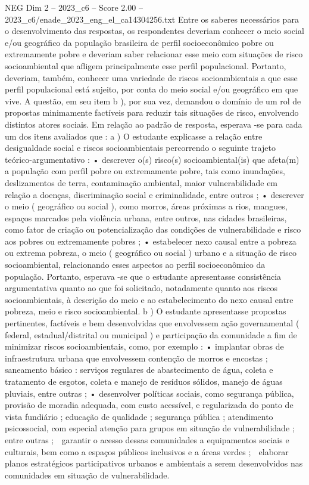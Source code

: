 \begin{textsample}{NEG Dim 2 – 2023\_c6 – Score 2.00 – 2023\_c6/enade\_2023\_eng\_el\_ca14304256.txt}
Entre os saberes necessários para o desenvolvimento das respostas, os respondentes deveriam conhecer o meio social e/ou geográfico da população brasileira de perfil socioeconômico pobre ou extremamente pobre e deveriam saber relacionar esse meio com situações de risco socioambiental que afligem principalmente esse perfil populacional.
Portanto, deveriam, também, conhecer uma variedade de riscos socioambientais a que esse perfil populacional está sujeito, por conta do meio social e/ou geográfico em que vive.
A questão, em seu item b ), por sua vez, demandou o domínio de um rol de propostas minimamente factíveis para reduzir tais situações de risco, envolvendo distintos atores sociais.
Em relação ao padrão de resposta, esperava -se para cada um dos itens avaliados que : a ) O estudante explicasse a relação entre desigualdade social e riscos socioambientais percorrendo o seguinte trajeto teórico-argumentativo : • descrever o(s) risco(s) socioambiental(is) que afeta(m) a população com perfil pobre ou extremamente pobre, tais como inundações, deslizamentos de terra, contaminação ambiental, maior vulnerabilidade em relação a doenças, discriminação social e criminalidade, entre outros ; • descrever o meio ( geográfico ou social ), como morros, áreas próximas a rios, mangues, espaços marcados pela violência urbana, entre outros, nas cidades brasileiras, como fator de criação ou potencialização das condições de vulnerabilidade e risco aos pobres ou extremamente pobres ; • estabelecer nexo causal entre a pobreza ou extrema pobreza, o meio ( geográfico ou social ) urbano e a situação de risco socioambiental, relacionando esses aspectos ao perfil socioeconômico da população.
Portanto, esperava -se que o estudante apresentasse consistência argumentativa quanto ao que foi solicitado, notadamente quanto aos riscos socioambientais, à descrição do meio e ao estabelecimento do nexo causal entre pobreza, meio e risco socioambiental. b ) O estudante apresentasse propostas pertinentes, factíveis e bem desenvolvidas que envolvessem ação governamental ( federal, estadual/distrital ou municipal ) e participação da comunidade a fim de minimizar riscos socioambientais, como, por exemplo : • implantar obras de infraestrutura urbana que envolvessem contenção de morros e encostas ; saneamento básico : serviços regulares de abastecimento de água, coleta e tratamento de esgotos, coleta e manejo de resíduos sólidos, manejo de águas pluviais, entre outras ; • desenvolver políticas sociais, como segurança pública, provisão de moradia adequada, com custo acessível, e regularizada do ponto de vista fundiário ; educação de qualidade ; segurança pública ; atendimento psicossocial, com especial atenção para grupos em situação de vulnerabilidade ; entre outras ;  garantir o acesso dessas comunidades a equipamentos sociais e culturais, bem como a espaços públicos inclusivos e a áreas verdes ;  elaborar planos estratégicos participativos urbanos e ambientais a serem desenvolvidos nas comunidades em situação de vulnerabilidade.

\end{textsample}
